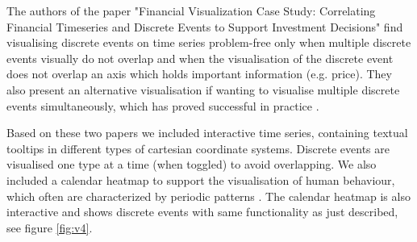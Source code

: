 The authors of the paper "Financial Visualization Case Study: Correlating Financial Timeseries and Discrete Events to Support Investment Decisions" find visualising discrete events on time series problem-free only when multiple discrete events visually do not overlap and when the visualisation of the discrete event does not overlap an axis which holds important information (e.g. price). They also present an alternative visualisation if wanting to visualise multiple discrete events simultaneously, which has proved successful in practice \citep{sorenson2013}.

Based on these two papers we included interactive time series, containing textual tooltips in different types of cartesian coordinate systems. Discrete events are visualised one type at a time (when toggled) to avoid overlapping. We also included a calendar heatmap to support the visualisation of human behaviour, which often are characterized by periodic patterns \citep{Cuttone}. The calendar heatmap is also interactive and shows discrete events with same functionality as just described, see figure \ref{fig:v4}. 

